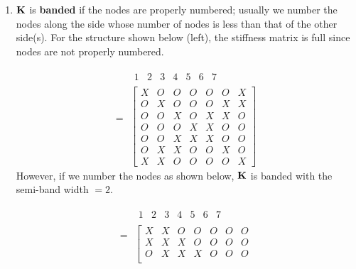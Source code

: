 \begin{enumerate}[leftmargin=*]
  \item $\mathbf{K}$ is \textbf{banded} if the nodes are properly numbered; usually we number the nodes along the side whose number of nodes is less than that of the other side(s). For the structure shown below (left), the stiffness matrix is full since nodes are not properly numbered.
    \begin{fig}
      
    \end{fig}
    \begin{fig}
      
    \end{fig}
    \begin{equation*}
      [\Kmat] =
      \begin{array}{c}
        \begin{array}{ccccccc} 1 & 2 & 3 & 4 & 5 & 6 & 7 \end{array}\\
        \left[\begin{array}{ccccccc}
          X & O & O & O & O & O & X\\
          O & X & O & O & O & X & X\\
          O & O & X & O & X & X & O\\
          O & O & O & X & X & O & O\\
          O & O & X & X & X & O & O\\
          O & X & X & O & O & X & O\\
          X & X & O & O & O & O & X
        \end{array}\right]
      \end{array}
    \end{equation*}
    However, if we number the nodes as shown below, $\mathbf{K}$ is banded with the semi-band width $=2$.
    \begin{fig}
      
    \end{fig}
    \begin{equation*}
      [\Kmat] =
      \begin{array}{c}
        \begin{array}{ccccccc} 1 & 2 & 3 & 4 & 5 & 6 & 7 \end{array}\\
        \left[\begin{array}{ccccccc}
          X & X & O & O & O & O & O\\
          X & X & X & O & O & O & O\\
          O & X & X & X & O & O & O\\

\end{array}
\end{array}
\end{equation*}
\end{enumerate}
